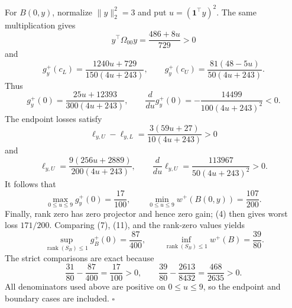 For \(B(0,y)\), normalize \(\lVert y\rVert_2^2=3\) and put \(u=(\mathbf1^{\top}y)^2\).  The same multiplication gives
\[
y^{\top}\Omega_{00}y=\frac{486+8u}{729}>0
\]
and
\[
g_y^+(c_L)=\frac{1240u+729}{150(4u+243)},
\qquad
g_y^+(c_U)=\frac{81(48-5u)}{50(4u+243)}.
\tag{8}
\]
Thus
\[
g_y^+(0)=\frac{25u+12393}{300(4u+243)},
\qquad
\frac{d}{du}g_y^+(0)
=-\frac{14499}{100(4u+243)^2}<0.
\tag{9}
\]
The endpoint losses satisfy
\[
\ell_{y,U}-\ell_{y,L}
=\frac{3(59u+27)}{10(4u+243)}>0
\]
and
\[
\ell_{y,U}=\frac{9(256u+2889)}{200(4u+243)},
\qquad
\frac{d}{du}\ell_{y,U}
=\frac{113967}{50(4u+243)^2}>0.
\tag{10}
\]
It follows that
\[
\max_{0\le u\le9}g_y^+(0)=\frac{17}{100},
\qquad
\min_{0\le u\le9}w^+(B(0,y))=\frac{107}{200}.
\tag{11}
\]
Finally, rank zero has zero projector and hence zero gain; (4) then gives worst loss \(171/200\).  Comparing (7), (11), and the rank-zero values yields
\[
\sup_{\operatorname{rank}(S_B)\le1}g_B^+(0)=\frac{87}{400},
\qquad
\inf_{\operatorname{rank}(S_B)\le1}w^+(B)=\frac{39}{80}.
\]
The strict comparisons are exact because
\[
\frac{31}{80}-\frac{87}{400}=\frac{17}{100}>0,
\qquad
\frac{39}{80}-\frac{2613}{8432}=\frac{468}{2635}>0.
\]
All denominators used above are positive on \(0\le u\le9\), so the endpoint and boundary cases are included. \(\square\)